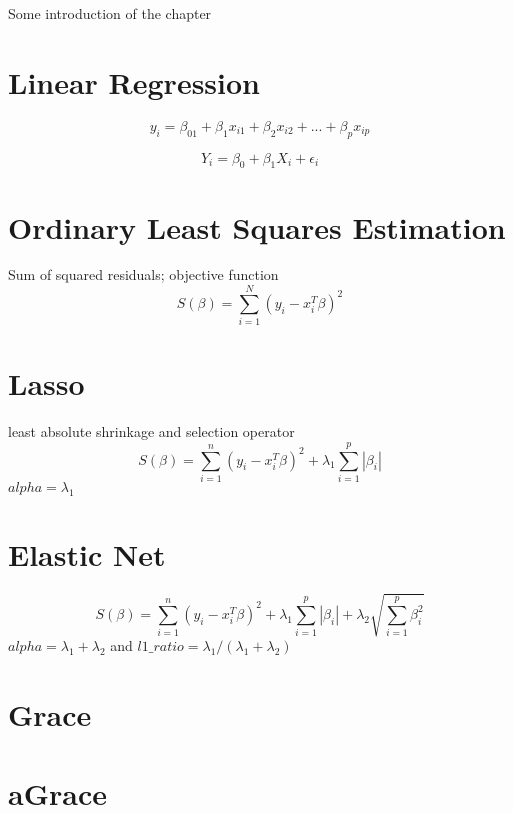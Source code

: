 Some introduction of the chapter


\section{Linear Regression}
\begin{equation}
y_i = \beta_01+\beta_1x_{i1}+\beta_2x_{i2}+...+\beta_px_{ip}
\end{equation}

\begin{equation}
Y_i = \beta_0 + \beta_1 X_i + \epsilon_i
\end{equation}


\section{Ordinary Least Squares Estimation}
Sum of squared residuals; objective function
\begin{equation}
S(\beta) = \sum_{i=1}^{N} (y_i - x_i^T\beta)^2
\end{equation}


\section{Lasso}
least absolute shrinkage and selection operator
\begin{equation}
S(\beta) = \sum_{i=1}^{n} (y_i - x_i^T\beta)^2 + \lambda_1\sum_{i=1}^{p}\left|\beta_i\right|
\end{equation}
$alpha = \lambda_1$


\section{Elastic Net}
\begin{equation}
S(\beta) = \sum_{i=1}^{n} (y_i - x_i^T\beta)^2 + \lambda_1\sum_{i=1}^{p}\left|\beta_i\right| + \lambda_2\sqrt{\sum_{i=1}^{p}\beta_i^2}
\end{equation}
$alpha = \lambda_1 + \lambda_2$ and $l1\_ratio = \lambda_1/(\lambda_1+\lambda_2)$

\section{Grace}

\section{aGrace}

